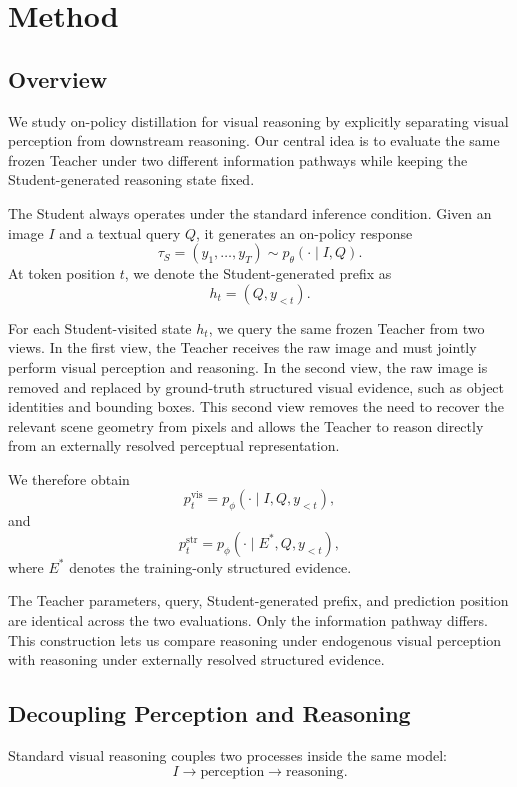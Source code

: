 \section{Method}

\subsection{Overview}

We study on-policy distillation for visual reasoning by explicitly separating visual perception from downstream reasoning.
Our central idea is to evaluate the same frozen Teacher under two different information pathways while keeping the Student-generated reasoning state fixed.

The Student always operates under the standard inference condition.
Given an image $I$ and a textual query $Q$, it generates an on-policy response
\[
\tau_S=(y_1,\ldots,y_T)
\sim
p_\theta(\cdot\mid I,Q).
\]
At token position $t$, we denote the Student-generated prefix as
\[
h_t=(Q,y_{<t}).
\]

For each Student-visited state $h_t$, we query the same frozen Teacher from two views.
In the first view, the Teacher receives the raw image and must jointly perform visual perception and reasoning.
In the second view, the raw image is removed and replaced by ground-truth structured visual evidence, such as object identities and bounding boxes.
This second view removes the need to recover the relevant scene geometry from pixels and allows the Teacher to reason directly from an externally resolved perceptual representation.

We therefore obtain
\[
p_t^{\mathrm{vis}}
=
p_\phi(\cdot\mid I,Q,y_{<t}),
\]
and
\[
p_t^{\mathrm{str}}
=
p_\phi(\cdot\mid E^*,Q,y_{<t}),
\]
where $E^*$ denotes the training-only structured evidence.

The Teacher parameters, query, Student-generated prefix, and prediction position are identical across the two evaluations.
Only the information pathway differs.
This construction lets us compare reasoning under endogenous visual perception with reasoning under externally resolved structured evidence.

\subsection{Decoupling Perception and Reasoning}

Standard visual reasoning couples two processes inside the same model:
\[
I
\rightarrow
\text{perception}
\rightarrow
\text{reasoning}.
\]

